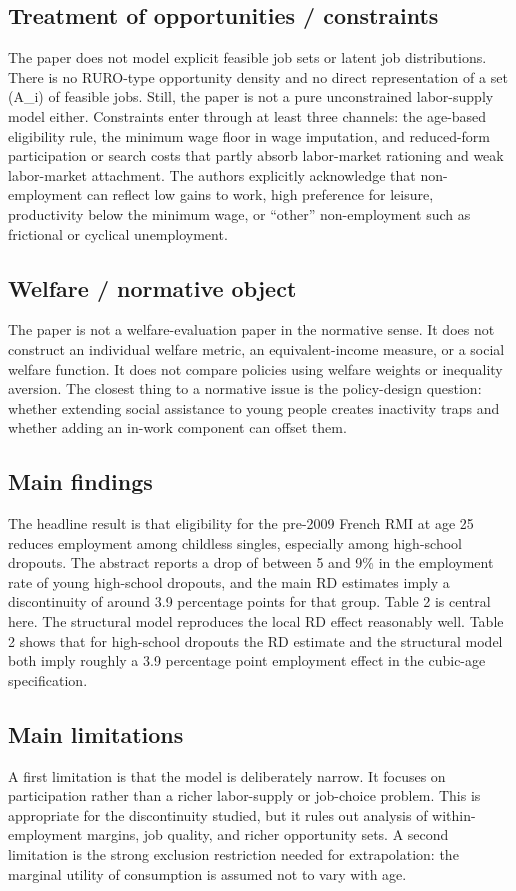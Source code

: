 \documentclass[11pt,a4paper]{article}
\begin{document}
\subsection*{Treatment of opportunities / constraints}
The paper does not model explicit feasible job sets or latent job distributions. There is no RURO-type opportunity density and no direct representation of a set (A\_i) of feasible jobs. Still, the paper is not a pure unconstrained labor-supply model either. Constraints enter through at least three channels: the age-based eligibility rule, the minimum wage floor in wage imputation, and reduced-form participation or search costs that partly absorb labor-market rationing and weak labor-market attachment. The authors explicitly acknowledge that non-employment can reflect low gains to work, high preference for leisure, productivity below the minimum wage, or “other” non-employment such as frictional or cyclical unemployment.

\subsection*{Welfare / normative object}
The paper is not a welfare-evaluation paper in the normative sense. It does not construct an individual welfare metric, an equivalent-income measure, or a social welfare function. It does not compare policies using welfare weights or inequality aversion. The closest thing to a normative issue is the policy-design question: whether extending social assistance to young people creates inactivity traps and whether adding an in-work component can offset them.

\subsection*{Main findings}
The headline result is that eligibility for the pre-2009 French RMI at age 25 reduces employment among childless singles, especially among high-school dropouts. The abstract reports a drop of between 5 and 9\% in the employment rate of young high-school dropouts, and the main RD estimates imply a discontinuity of around 3.9 percentage points for that group. Table 2 is central here. The structural model reproduces the local RD effect reasonably well. Table 2 shows that for high-school dropouts the RD estimate and the structural model both imply roughly a 3.9 percentage point employment effect in the cubic-age specification.

\subsection*{Main limitations}
A first limitation is that the model is deliberately narrow. It focuses on participation rather than a richer labor-supply or job-choice problem. This is appropriate for the discontinuity studied, but it rules out analysis of within-employment margins, job quality, and richer opportunity sets. A second limitation is the strong exclusion restriction needed for extrapolation: the marginal utility of consumption is assumed not to vary with age.
\end{document}
